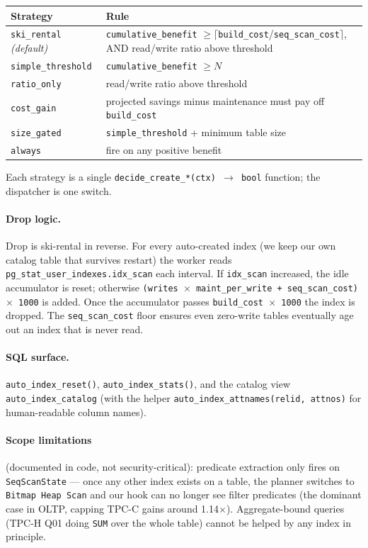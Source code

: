 \documentclass[10pt,a4paper]{article}
\newcommand{\code}[1]{\texttt{\small #1}}
\begin{document}
\begin{center}\small
\begin{tabular}{ll}
\toprule
\textbf{Strategy} & \textbf{Rule} \\
\midrule
\code{ski\_rental} \emph{(default)} & \code{cumulative\_benefit} $\geq \lceil$\code{build\_cost}/\code{seq\_scan\_cost}$\rceil$, AND read/write ratio above threshold \\
\code{simple\_threshold}            & \code{cumulative\_benefit} $\geq N$ \\
\code{ratio\_only}                  & read/write ratio above threshold \\
\code{cost\_gain}                   & projected savings minus maintenance must pay off \code{build\_cost} \\
\code{size\_gated}                  & \code{simple\_threshold} + minimum table size \\
\code{always}                       & fire on any positive benefit \\
\bottomrule
\end{tabular}
\end{center}

Each strategy is a single \code{decide\_create\_*(ctx) $\to$ bool}
function; the dispatcher is one switch.

\paragraph{Drop logic.} Drop is ski-rental in reverse. For every
auto-created index (we keep our own catalog table that survives
restart) the worker reads \code{pg\_stat\_user\_indexes.idx\_scan}
each interval. If \code{idx\_scan} increased, the idle accumulator is
reset; otherwise \code{(writes $\times$ maint\_per\_write +
seq\_scan\_cost) $\times$ 1000} is added. Once the accumulator passes
\code{build\_cost $\times$ 1000} the index is dropped. The
\code{seq\_scan\_cost} floor ensures even zero-write tables eventually
age out an index that is never read.

\paragraph{SQL surface.} \code{auto\_index\_reset()},
\code{auto\_index\_stats()}, and the catalog view
\code{auto\_index\_catalog} (with the helper
\code{auto\_index\_attnames(relid, attnos)} for human-readable column
names).

\paragraph{Scope limitations} (documented in code, not
security-critical): predicate extraction only fires on
\code{SeqScanState} --- once any other index exists on a table, the
planner switches to \code{Bitmap Heap Scan} and our hook can no longer
see filter predicates (the dominant case in OLTP, capping TPC-C gains
around 1.14$\times$). Aggregate-bound queries (TPC-H Q01 doing
\code{SUM} over the whole table) cannot be helped by any index in
principle.
\end{document}
